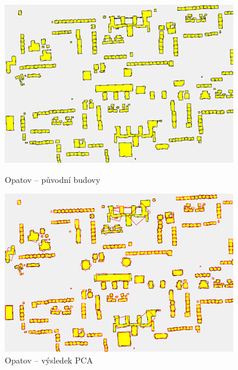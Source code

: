\documentclass{article}
\begin{document}
\begin{spacing}{1.5}
\begin{figure}[htbp]
  \centering
  \begin{minipage}[b]{0.43\textwidth}
    \includegraphics[width=\textwidth]{images/Opatov_orig.png}
    \caption{Opatov – původní budovy}
  \end{minipage}
  \hfill
  \begin{minipage}[b]{0.43\textwidth}
    \includegraphics[width=\textwidth]{images/Opatov_pca.png}
    \caption{Opatov – výsledek PCA}
  \end{minipage}
\end{figure}


\end{spacing}
\end{document}
